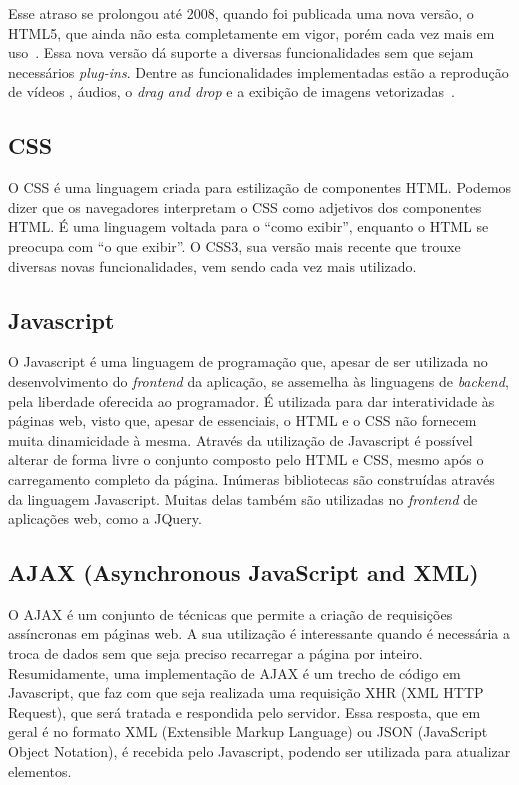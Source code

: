 Esse atraso se prolongou até 2008, quando foi publicada uma nova versão, o HTML5, que ainda não esta completamente em vigor, porém cada vez mais em uso~\cite{wikipediahtml}. Essa nova versão dá suporte a diversas funcionalidades sem que sejam necessários \textit{plug-ins}. Dentre as funcionalidades implementadas estão a reprodução de vídeos , áudios, o \textit{drag and drop} e a exibição de imagens vetorizadas~\cite{videohtml}.

\subsection{CSS}

O CSS é uma linguagem criada para estilização de componentes HTML. Podemos dizer que os navegadores interpretam o CSS como adjetivos dos componentes HTML. É uma linguagem voltada para o ``como exibir'', enquanto o HTML se preocupa com ``o que exibir''. O CSS3, sua versão mais recente que trouxe diversas novas funcionalidades, vem sendo cada vez mais utilizado.

\subsection{Javascript}

O Javascript é uma linguagem de programação que, apesar de ser utilizada no desenvolvimento do \textit{frontend} da aplicação, se assemelha às linguagens de \textit{backend}, pela liberdade oferecida ao programador. É utilizada para dar interatividade às páginas web, visto que, apesar de essenciais, o HTML e o CSS não fornecem muita dinamicidade à mesma. Através da utilização de Javascript é possível alterar de forma livre o conjunto composto pelo HTML e CSS, mesmo após o carregamento completo da página. Inúmeras bibliotecas são construídas através da linguagem Javascript. Muitas delas também são utilizadas no \textit{frontend} de aplicações web, como a JQuery.

\subsection{AJAX (Asynchronous JavaScript and XML)}

O AJAX é um conjunto de técnicas que permite a criação de requisições assíncronas em páginas web. A sua utilização é interessante quando é necessária a troca de dados sem que seja preciso recarregar a página por inteiro. Resumidamente, uma implementação de AJAX é um trecho de código em Javascript, que faz com que seja realizada uma requisição XHR (XML HTTP Request),
que será tratada e respondida pelo servidor. Essa resposta, que em geral é no formato XML (Extensible Markup Language)
ou JSON (JavaScript Object Notation),
é recebida pelo Javascript, podendo ser utilizada para atualizar elementos.

